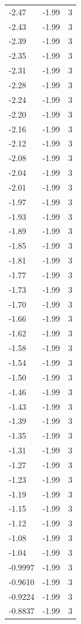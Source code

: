 \begin{longtable}{lrr}
  -2.47 & -1.99 & 3 \\
  -2.43 & -1.99 & 3 \\
  -2.39 & -1.99 & 3 \\
  -2.35 & -1.99 & 3 \\
  -2.31 & -1.99 & 3 \\
  -2.28 & -1.99 & 3 \\
  -2.24 & -1.99 & 3 \\
  -2.20 & -1.99 & 3 \\
  -2.16 & -1.99 & 3 \\
  -2.12 & -1.99 & 3 \\
  -2.08 & -1.99 & 3 \\
  -2.04 & -1.99 & 3 \\
  -2.01 & -1.99 & 3 \\
  -1.97 & -1.99 & 3 \\
  -1.93 & -1.99 & 3 \\
  -1.89 & -1.99 & 3 \\
  -1.85 & -1.99 & 3 \\
  -1.81 & -1.99 & 3 \\
  -1.77 & -1.99 & 3 \\
  -1.73 & -1.99 & 3 \\
  -1.70 & -1.99 & 3 \\
  -1.66 & -1.99 & 3 \\
  -1.62 & -1.99 & 3 \\
  -1.58 & -1.99 & 3 \\
  -1.54 & -1.99 & 3 \\
  -1.50 & -1.99 & 3 \\
  -1.46 & -1.99 & 3 \\
  -1.43 & -1.99 & 3 \\
  -1.39 & -1.99 & 3 \\
  -1.35 & -1.99 & 3 \\
  -1.31 & -1.99 & 3 \\
  -1.27 & -1.99 & 3 \\
  -1.23 & -1.99 & 3 \\
  -1.19 & -1.99 & 3 \\
  -1.15 & -1.99 & 3 \\
  -1.12 & -1.99 & 3 \\
  -1.08 & -1.99 & 3 \\
  -1.04 & -1.99 & 3 \\
  -0.9997 & -1.99 & 3 \\
  -0.9610 & -1.99 & 3 \\
  -0.9224 & -1.99 & 3 \\
  -0.8837 & -1.99 & 3 \\

\end{longtable}
